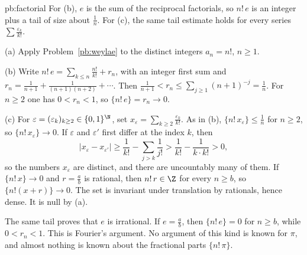\begin{solution}{pb:factorial}
\idea For (b), $e$ is the sum of the reciprocal factorials, so $n!\,e$ is an integer plus a tail of size about $\frac1n$. For (c), the same tail estimate holds for every series $\sum\frac{\varepsilon_k}{k!}$.

\writeup (a) Apply Problem~\ref{pb:weylae} to the distinct integers $a_n=n!$, $n\ge 1$.

(b) Write $n!\,e=\sum_{k\le n}\frac{n!}{k!}+r_n$, with an integer first sum and $r_n=\frac1{n+1}+\frac1{(n+1)(n+2)}+\cdots$. Then $\frac1{n+1}<r_n\le\sum_{j\ge 1}(n+1)^{-j}=\frac1n$. For $n\ge 2$ one has $0<r_n<1$, so $\{n!\,e\}=r_n\to 0$.

(c) For $\varepsilon=(\varepsilon_k)_{k\ge 2}\in\{0,1\}^{\N}$, set $x_\varepsilon=\sum_{k\ge 2}\frac{\varepsilon_k}{k!}$. As in (b), $\{n!\,x_\varepsilon\}\le\frac1n$ for $n\ge 2$, so $\{n!\,x_\varepsilon\}\to 0$. If $\varepsilon$ and $\varepsilon'$ first differ at the index $k$, then
\[
|x_\varepsilon-x_{\varepsilon'}|\ge\frac1{k!}-\sum_{j>k}\frac1{j!}>\frac1{k!}-\frac1{k\cdot k!}>0,
\]
so the numbers $x_\varepsilon$ are distinct, and there are uncountably many of them. If $\{n!\,x\}\to 0$ and $r=\frac ab$ is rational, then $n!\,r\in\Z$ for every $n\ge b$, so $\{n!(x+r)\}\to 0$. The set is invariant under translation by rationals, hence dense. It is null by (a).

\leads The same tail proves that $e$ is irrational. If $e=\frac ab$, then $\{n!\,e\}=0$ for $n\ge b$, while $0<r_n<1$. This is Fourier's argument. No argument of this kind is known for $\pi$, and almost nothing is known about the fractional parts $\{n!\,\pi\}$.
\end{solution}


